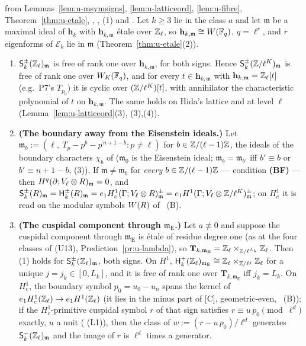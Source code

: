 \documentclass[11pt]{article}
\newcommand{\hcusp}{\mathbf{h}}                   %
\newcommand{\Tu}{\mathbf{T}}                      %
\newcommand{\Eis}{\mathrm{E}}
\newcommand{\Ek}{\mathcal{E}}                     %
\newcommand{\Zl}{\Z_\ell}
\begin{document}
\begin{proposition}\label{prop:u-msymfree}
\PROVED{} from Lemmas~\ref{lem:u-msymsigns}, \ref{lem:u-latticeord}, \ref{lem:u-fibre}, Theorem~\ref{thm:u-etale}, , , (1) and
. Let $k\ge3$ lie in the class $a$ and let $\mathfrak m$ be a maximal ideal of $\hcusp_k$ with $\hcusp_{k,\mathfrak m}$ étale over $\Zl$, so
$\hcusp_{k,\mathfrak m}\cong W(\F_q)$, $q=\ell^{r}$, and $r$ eigenforms of $\Ek_k$ lie in $\mathfrak m$ (Theorem~\ref{thm:u-etale}(2)).
\begin{enumerate}
\item $\mathsf S^{\pm}_k(\Zl)_{\mathfrak m}$ is free of rank one over $\hcusp_{k,\mathfrak m}$, for both signs. Hence $\mathsf S^{\pm}_k(\mathbb{Z}/\ell^{K})_{\mathfrak m}$ is free of rank one over
  $W_K(\mathbb{F}_q)$, and for every $t\in\hcusp_{k,\mathfrak m}$ with $\hcusp_{k,\mathfrak m}=\Zl[t]$ (e.g.\ P7's $T_{p_0}$) it is cyclic over $(\mathbb{Z}/\ell^{K})[t]$, with annihilator the characteristic
  polynomial of $t$ on $\hcusp_{k,\mathfrak m}$. The same holds on Hida's lattice and at level $\ell$ (Lemma~\ref{lem:u-latticeord}(3), (3),(4)).
\item \textbf{(The boundary away from the Eisenstein ideals.)} Let $\mathfrak m_b:=(\ell,\ T_p-p^{b}-p^{\,n+1-b}:p\ne\ell)$ for $b\in\mathbb{Z}/(\ell-1)\mathbb{Z}$, the ideals of the boundary
  characters $\chi_b$ of  ($\mathfrak m_0$ is the Eisenstein ideal; $\mathfrak m_b=\mathfrak m_{b'}$ iff $b'\equiv b$ or $b'\equiv n+1-b$, (3)). If $\mathfrak m\ne\mathfrak m_b$
  for \emph{every} $b\in\mathbb{Z}/(\ell-1)\mathbb{Z}$ --- condition \textbf{(BF)} --- then
  $H^{q}(\partial;V_\ell\otimes R)_{\mathfrak m}=0$, and $\mathsf S^{\pm}_k(R)_{\mathfrak m}=\mathsf H^{\pm}_k(R)_{\mathfrak m}=e_1H^{1}_c(\Gamma;V_\ell\otimes R)^{\pm}_{\mathfrak m}=
  e_1H^{1}(\Gamma;V_\ell\otimes\mathbb{Z}/\ell^{K})^{\pm}_{\mathfrak m}$; on $H^{1}_c$ it is read on the modular symbols $W(R)$ of ~(B).
\item \textbf{(The cuspidal component through $\mathfrak m_\Eis$.)} Let $a\not\equiv0$ and suppose the cuspidal component through $\mathfrak m_\Eis$ is étale of residue degree one (as at the
  four classes of (U13), Prediction~\ref{pr:u-lambda}), so $\Tu_{k,\mathfrak m_\Eis}=\Zl\times_{\Z/\ell^{L_k}}\Zl$. Then (1) holds for $\mathsf S^{\pm}_k(\Zl)_{\mathfrak m}$, both signs. On
  $H^{1}$, $\mathsf H^{+}_k(\Zl)_{\mathfrak m_\Eis}\cong\Zl\times_{\Z/\ell^{j}}\Zl$ for a unique $j=j_k\in[0,L_k]$, and it is free of rank one over $\Tu_{k,\mathfrak m_\Eis}$ iff $j_k=L_k$. On
  $H^{1}_c$, the boundary symbol $p_0=u_0-u_n$ spans the kernel of $e_1H^{1}_c(\Zl)\to e_1H^{1}(\Zl)$ (it lies in the minus part of [C], geometric-even, ~(B)); if the
  $H^{1}_c$-primitive cuspidal symbol $r$ of that sign satisfies $r\equiv u\,p_0\pmod{\ell^{d}}$ exactly, $u$ a unit ( (L1)), then the class of
  $w:=(r-u\,p_0)/\ell^{d}$ generates $\mathsf S^{-}_k(\Zl)_{\mathfrak m}$ and the image of $r$ is $\ell^{d}$ times a generator.
\end{enumerate}
\end{proposition}
\end{document}
